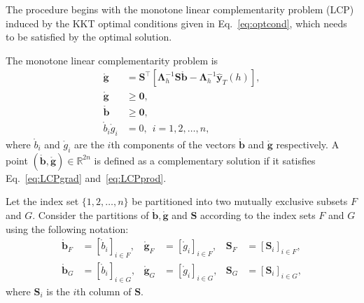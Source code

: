 \documentclass[twocolumn]{svjour3}
\begin{document}
The procedure begins with the monotone linear complementarity problem (LCP) induced by the KKT optimal conditions given in Eq.~\eqref{eq:optcond}, which needs to be satisfied by the optimal solution.

The monotone linear complementarity problem is
\begin{align}
\mathring{\bm{g}}            & = \bm{S}^\top[\bm{\Lambda}_{h}^{-1}\bm{S}\mathring{\bm{b}} - \bm{\Lambda}_{h}^{-1}\hat{\bm{y}}_{T}(h)],\label{eq:LCPgrad} \\
\mathring{\bm{g}}            & \geq \bm{0}, \label{eq:LCPg}                                                                                          \\
\mathring{\bm{b}}            & \geq \bm{0}, \label{eq:LCPb}                                                                                          \\
\mathring{b}_{i}\mathring{g}_{i} & = 0, \ \ i = 1, 2, \dots, n\label{eq:LCPprod},
\end{align}
where $\mathring{b}_{i}$ and $\mathring{g}_{i}$ are the $i$th components of the vectors $\mathring{\bm{b}}$ and $\mathring{\bm{g}}$ respectively. A point $(\mathring{\bm{b}}, \mathring{\bm{g}}) \in \mathbb{R}^{2n}$ is defined as a complementary solution if it satisfies Eq.~\eqref{eq:LCPgrad} and~\eqref{eq:LCPprod}.

Let the index set $\{1, 2, \dots, n\}$ be partitioned into two mutually exclusive subsets $F$ and $G$. Consider the partitions of $\mathring{\bm{b}}, \mathring{\bm{g}}$ and $\bm{S}$ according to the index sets $F$ and $G$ using the following notation:
\begin{align*}
\mathring{\bm{b}}_{F} & = [\mathring{b}_{i}]_{i \in F}, & \mathring{\bm{g}}_{F} & = [\mathring{g}_{i}]_{i \in F}, & \bm{S}_{F} & = [\bm{S}_{i}]_{i \in F}, \\
\mathring{\bm{b}}_{G} & = [\mathring{b}_{i}]_{i \in G}, & \mathring{\bm{g}}_{G} & = [\mathring{g}_{i}]_{i \in G}, & \bm{S}_{G} & = [\bm{S}_{i}]_{i \in G},
\end{align*}
where $\bm{S}_{i}$ is the $i$th column of $\bm{S}$.
\end{document}
